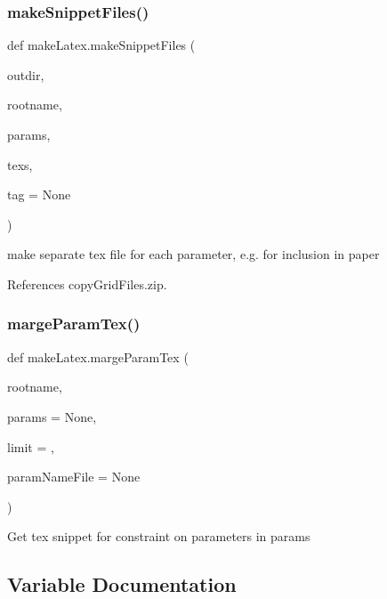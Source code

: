 \subsubsection{\texorpdfstring{make\+Snippet\+Files()}{makeSnippetFiles()}}
{\footnotesize\ttfamily def make\+Latex.\+make\+Snippet\+Files (\begin{DoxyParamCaption}\item[{}]{outdir,  }\item[{}]{rootname,  }\item[{}]{params,  }\item[{}]{texs,  }\item[{}]{tag = {\ttfamily None} }\end{DoxyParamCaption})}

\begin{DoxyVerb}make separate tex file for each parameter, e.g. for inclusion in paper \end{DoxyVerb}
 

References copy\+Grid\+Files.\+zip.

\mbox{\label{namespacemakeLatex_a44141ca7b3dfd236279c2c784ed21b3f}} 
\subsubsection{\texorpdfstring{marge\+Param\+Tex()}{margeParamTex()}}
{\footnotesize\ttfamily def make\+Latex.\+marge\+Param\+Tex (\begin{DoxyParamCaption}\item[{}]{rootname,  }\item[{}]{params = {\ttfamily None},  }\item[{}]{limit = {},  }\item[{}]{param\+Name\+File = {\ttfamily None} }\end{DoxyParamCaption})}

\begin{DoxyVerb}Get tex snippet for constraint on parameters in params \end{DoxyVerb}
 

\subsection{Variable Documentation}
\mbox{\label{namespacemakeLatex_a4bc0ea4fe13f8469fa97a3d52ead2380}} 
